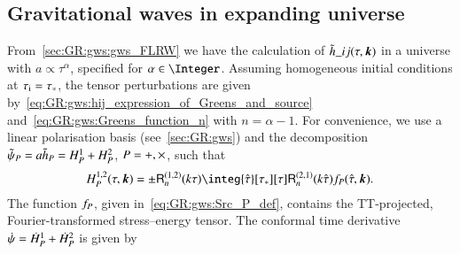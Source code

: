 




\subsection{Gravitational waves in expanding universe}
    From~\cref{sec:GR:gws:gws_FLRW} we have the calculation of $\tilde{h}\_{ij}(\tau, \boldsymbol{k})$ in a universe with $a\propto \tau^\alpha$, specified for ${\alpha\in\Integer}$. Assuming homogeneous initial conditions at $\tau_\mathrm{i}=\tau_\ast$, the tensor perturbations are given by~\cref{eq:GR:gws:hij_expression_of_Greens_and_source} and~\cref{eq:GR:gws:Greens_function_n} with $n=\alpha-1$. For convenience, we use a linear polarisation basis (see~\cref{sec:GR:gws}) and the decomposition $\tilde{\psi}_P = a\tilde{h}_P=H^{1}_P + H^2_P $, $P=+, \times$, such that~\citep{kawasakiStudyGravitationalRadiation2011}
    \begin{equation}\label{eq:pertwalls:gws:H_P_12}
        H_P^{1,2}(\tau, \vec{k}) = \pm\mathsf{R}^{(1,2)}_n(k\tau) \integ{\dummy{\tau}}[\tau_\ast][\tau]  \mathsf{R}^{(2,1)}_n(k\dummy{\tau})  \Src_P(\dummy{\tau}, \vec{k}).
    \end{equation}
    The function $f_P$, given in~\cref{eq:GR:gws:Src_P_def},
    contains the TT-projected, Fourier-transformed stress--energy tensor. The conformal time derivative $\dot{\psi} = \dot{H}^1_P + \dot{H}^2_P $ is given by
